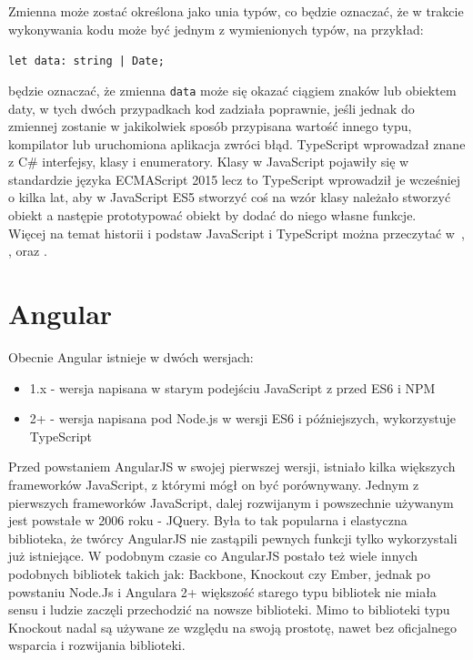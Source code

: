\documentclass[12pt,a4paper,oneside]{book}
\begin{document}
Zmienna może zostać określona jako unia typów, co będzie oznaczać, że w trakcie wykonywania kodu może być jednym z wymienionych typów, na przykład:
\begin{center}
  \texttt{let data: string | Date;}
\end{center}
będzie oznaczać, że zmienna \texttt{data} może się okazać ciągiem znaków lub obiektem daty, w tych dwóch przypadkach kod zadziała poprawnie, jeśli jednak do zmiennej zostanie w jakikolwiek sposób przypisana wartość innego typu, kompilator lub uruchomiona aplikacja zwróci błąd. TypeScript wprowadzał znane z C\# interfejsy, klasy i enumeratory. Klasy w JavaScript pojawiły się w standardzie języka ECMAScript 2015 lecz to TypeScript wprowadził je wcześniej o kilka lat, aby w JavaScript ES5 stworzyć coś na wzór klasy należało stworzyć obiekt a następie prototypować obiekt by dodać do niego własne funkcje.
\hfill \\

Więcej na temat historii i podstaw JavaScript i TypeScript można przeczytać w~\cite{DOM_SCRIPTING}, \cite{MODULAR_JAVASCRIPT}, \cite{MASTERING_TYPESCRIPT} oraz \cite{JS_HIGH_PERFORMANCE}.

\section{Angular}
Obecnie Angular istnieje w dwóch wersjach:
\begin{itemize}
  \item 1.x - wersja napisana w starym podejściu JavaScript z przed ES6 i NPM
  \item 2+ - wersja napisana pod Node.js w wersji ES6 i późniejszych, wykorzystuje TypeScript
\end{itemize}

Przed powstaniem AngularJS w swojej pierwszej wersji, istniało kilka większych frameworków JavaScript, z którymi mógł on być porównywany. Jednym z pierwszych frameworków JavaScript, dalej rozwijanym i powszechnie używanym jest powstałe w 2006 roku - JQuery. Była to tak popularna i elastyczna biblioteka, że twórcy AngularJS nie zastąpili pewnych funkcji tylko wykorzystali już istniejące. W podobnym czasie co AngularJS postało też wiele innych podobnych bibliotek takich jak: Backbone, Knockout czy Ember, jednak po powstaniu Node.Js i Angulara 2+ większość starego typu bibliotek nie miała sensu i ludzie zaczęli przechodzić na nowsze biblioteki. Mimo to biblioteki typu Knockout nadal są używane ze względu na swoją prostotę, nawet bez oficjalnego wsparcia i rozwijania biblioteki.
\end{document}

